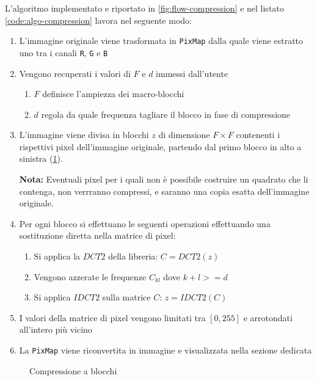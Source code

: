 \documentclass[11pt,italian]{article}
\begin{document}
L'algoritmo implementato e riportato in \cref{fig:flow-compression} e nel listato \ref{code:algo-compression} lavora nel seguente modo:
\begin{enumerate}
    \item L’immagine originale viene trasformata in \lstinline{PixMap} dalla quale viene estratto uno tra i canali \lstinline{R}, \lstinline{G} e \lstinline{B}
	\item Vengono recuperati i valori di $F$ e $d$ immessi dall’utente
	\begin{enumerate}
		\item $F$ definisce l’ampiezza dei macro-blocchi
		\item $d$ regola da quale frequenza tagliare il blocco in fase di compressione
	\end{enumerate}
    \item L’immagine viene divisa in blocchi $z$ di dimensione $F\times F$ contenenti i rispettivi pixel dell'immagine originale, partendo dal primo blocco in alto a sinistra (\cref{fig:flow-compression-block}).

    \textbf{Nota:} Eventuali pixel per i quali non è possibile costruire un quadrato che li contenga, non verrranno compressi, e saranno una copia esatta dell'immagine originale.

	\item Per ogni blocco si effettuano le seguenti operazioni effettuando una sostituzione diretta nella matrice di pixel:
	\begin{enumerate}
		\item Si applica la $\mathit{DCT2}$ della libreria: $C = \mathit{DCT2}(z)$
		\item Vengono azzerate le frequenze $C_{kl}$ dove $k+l >= d$
		\item Si applica $\mathit{IDCT2}$ sulla matrice $C$: $z = \mathit{IDCT2}(C)$
	\end{enumerate}
	\item I valori della matrice di pixel vengono limitati tra $[0,255]$ e arrotondati all'intero più vicino
	\item La \lstinline{PixMap} viene riconvertita in immagine e visualizzata nella sezione dedicata
\end{enumerate}

\begin{figure}[H]
    \caption{Compressione a blocchi}
    \label{fig:flow-compression-block}
\end{figure}
\end{document}
